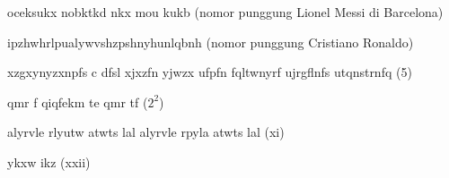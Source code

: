 \documentclass[11pt]{scrartcl}
\begin{document}
\begin{problem}
oceksukx nobktkd nkx mou kukb (nomor punggung Lionel Messi di Barcelona)
\end{problem}

\begin{problem}
 ipzhwhrlpualywvshzpshnyhunlqbnh (nomor punggung Cristiano Ronaldo)
\end{problem}

\begin{problem}
xzgxynyzxnpfs c dfsl xjxzfn yjwzx ufpfn fqltwnyrf ujrgflnfs utqnstrnfq (5)
\end{problem}

\begin{problem}
qmr f qiqfekm te qmr tf ($2^2$)
\end{problem}

\begin{problem}
alyrvle rlyutw atwts lal alyrvle rpyla atwts lal (xi)
\end{problem}

\begin{problem}
ykxw ikz (xxii)
\end{problem}
\end{document}
